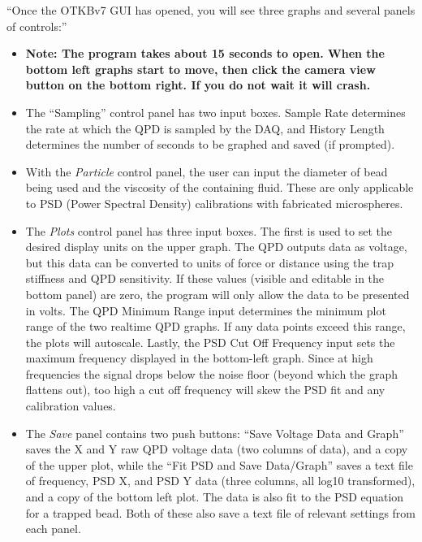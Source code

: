 \documentclass{../lab}
\begin{document}
``Once the OTKBv7 GUI has opened, you will see three graphs and several panels of controls:''

\begin{itemize}
    \item \textbf{Note: The program takes about 15 seconds to open. When the bottom left graphs start to move, then click the camera view button on the bottom right. If you do not wait it will crash.}

\end{itemize}

\begin{itemize}
    \item The ``Sampling'' control panel has two input boxes. Sample Rate determines the rate at which the QPD is sampled by the DAQ, and History Length determines the number of seconds to be graphed and saved (if prompted).

\end{itemize}

\begin{itemize}
    \item With the \emph{Particle} control panel, the user can input the diameter of bead being used and the viscosity of the containing fluid. These are only applicable to PSD (Power Spectral Density) calibrations with fabricated microspheres.

\end{itemize}

\begin{itemize}
    \item The \emph{Plots} control panel has three input boxes. The first is used to set the desired display units on the upper graph. The QPD outputs data as voltage, but this data can be converted to units of force or distance using the trap stiffness and QPD sensitivity. If these values (visible and editable in the bottom panel) are zero, the program will only allow the data to be presented in volts. The QPD Minimum Range input determines the minimum plot range of the two realtime QPD graphs. If any data points exceed this range, the plots will autoscale. Lastly, the PSD Cut Off Frequency input sets the maximum frequency displayed in the bottom-left graph. Since at high frequencies the signal drops below the noise floor (beyond which the graph flattens out), too high a cut off frequency will skew the PSD fit and any calibration values.

\end{itemize}

\begin{itemize}
    \item The \emph{Save} panel contains two push buttons: ``Save Voltage Data and Graph'' saves the X and Y raw QPD voltage data (two columns of data), and a copy of the upper plot, while the ``Fit PSD and Save Data/Graph'' saves a text file of frequency, PSD X, and PSD Y data (three columns, all log10 transformed), and a copy of the bottom left plot. The data is also fit to the PSD equation for a trapped bead. Both of these also save a text file of relevant settings from each panel.

\end{itemize}
\end{document}
